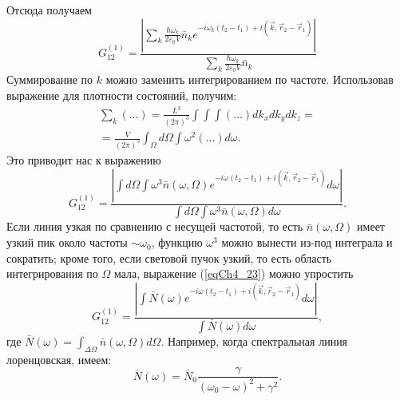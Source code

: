 Отсюда получаем
\begin{equation}
G_{12}^{(1)} = \frac{\left|
\sum_{k} 
\frac{\hbar \omega_k}{2 \varepsilon_0 V}
\bar{n}_k e^{-i \omega_k \left(t_2 - t_1\right) + 
i \left(\vec{k}, \vec{r}_2 - \vec{r}_1\right)}
\right|}{
\sum_{k}
\frac{\hbar \omega_k}{2 \varepsilon_0 V}
\bar{n}_k
}
\label{eqCh4_22}
\end{equation}
Суммирование по $k$ можно заменить интегрированием по
частоте. Использовав выражение для плотности состояний, получим: 
\begin{eqnarray}
\sum_{k}\left(\dots\right) = \frac{L^3}{\left(2 \pi\right)^3}
\int \int \int \left(\dots\right) d k_x d k_y d k_z =
\nonumber \\
= \frac{V}{\left(2 \pi\right)^3}
\int_{\Omega} d \Omega \int \omega^2 \left(\dots\right) d \omega.
\nonumber
\end{eqnarray}
Это приводит нас к выражению
\begin{equation}
G_{12}^{(1)} = \frac{\left|
\int d \Omega \int \omega^3 \bar{n}\left(\omega, \Omega\right) 
e^{-i \omega\left(t_2 - t_1\right) + i \left(\vec{k}, \vec{r}_2 -
  \vec{r}_1 \right)}
d \omega
\right|}{
\int d \Omega \int \omega^3 \bar{n}\left(\omega, \Omega\right) d \omega
}.
\label{eqCh4_23}
\end{equation}
Если линия узкая по сравнению с несущей частотой, то есть 
$\bar{n}\left(\omega, \Omega\right)$ имеет
узкий пик около частоты  $\sim \omega_0$,  функцию $\omega^3$ можно
вынести из-под интеграла и сократить; кроме того, если световой пучок узкий,
то есть область интегрирования по $\Omega$ мала, выражение
(\ref{eqCh4_23}) можно упростить 
\begin{equation}
G_{12}^{(1)} = \frac{\left|
\int \bar{N}\left(\omega\right) 
e^{-i \omega\left(t_2 - t_1\right) + i \left(\vec{k}, \vec{r}_2 -
  \vec{r}_1 \right)}
d \omega
\right|}{
\int \bar{N}\left(\omega\right) d \omega
},
\label{eqCh4_24}
\end{equation}
где $\bar{N}\left(\omega\right) = \int_{\Delta \Omega}
\bar{n}\left(\omega, \Omega\right) d \Omega$.  Например, когда
спектральная линия лоренцовская, имеем:
\[
\bar{N}\left(\omega\right) = \bar{N}_0\frac{\gamma}{\left(\omega_0 -
  \omega\right)^2 + \gamma^2} .
\]  

